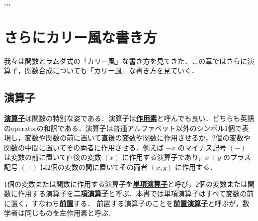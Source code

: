 \documentclass[a4paper,twocolumn]{jsbook}
\newcommand{\programminglanguage}[1]{\textsf{#1}}
\newcommand{\clang}{\programminglanguage{C}}
\newcommand{\haskell}{\programminglanguage{Haskell}}
\newenvironment{leader}{\begingroup\gt}{\endgroup}
\newenvironment{note}[1]{\begin{boxnote}\begin{center}\textbf{#1}\end{center}}{\end{boxnote}}
\newcommand{\keyword}[1]{{\underline{\textbf{#1}}}}
\newcommand{\code}[1]{\texttt{#1}}
\newenvironment{ccode}{\begin{itembox}[r]{\clang}}{\end{itembox}}
\begin{document}

\begin{note}{...}%
\end{note}


\chapter{さらにカリー風な書き方}
\label{ch:more-curry}

\begin{leader}
我々は関数とラムダ式の「カリー風」な書き方を見てきた．この章ではさらに演算子，関数合成についても「カリー風」な書き方を見ていく．
\end{leader}

\section{演算子}

\keyword{演算子}は関数の特別な姿である．演算子は\keyword{作用素}と呼んでも良い．どちらも英語のoperatorの和訳である．演算子は普通アルファベット以外のシンボル1個で表現し，変数や関数の前に置いて直後の変数や関数に作用させるか，2個の変数や関数の中間に置いてその両者に作用させる．例えば $-x$ のマイナス記号 $(-)$ は変数の前に置いて直後の変数 $(x)$ に作用する演算子であり，$x+y$ のプラス記号 $(+)$ は2個の変数の間に置いてその両者 $(x,y)$ に作用する．

1個の変数または関数に作用する演算子を\keyword{単項演算子}と呼び，2個の変数または関数に作用する演算子を\keyword{二項演算子}と呼ぶ．本書では単項演算子はすべて変数の前に置く，すなわち\keyword{前置}する．
前置する演算子のことを\keyword{前置演算子}と呼ぶが，数学者は同じものを左作用素と呼ぶ．
\end{document}
